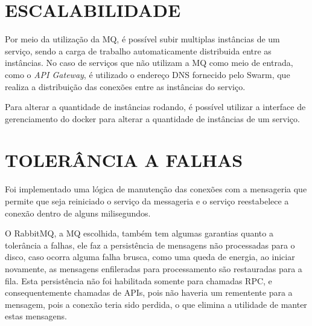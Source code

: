 \section{ESCALABILIDADE}

Por meio da utilização da \ac{MQ}, é possível subir multiplas instâncias de um serviço,
sendo a carga de trabalho automaticamente distribuida entre as instâncias. No caso de
serviços que não utilizam a \ac{MQ} como meio de entrada, como o \emph{API Gateway},
é utilizado o endereço \ac{DNS} fornecido pelo Swarm, que realiza a distribuição das
conexões entre as instâncias do serviço.

Para alterar a quantidade de instâncias rodando, é possível utilizar a interface de
gerenciamento do docker para alterar a quantidade de instâncias de um serviço.

\section{TOLERÂNCIA A FALHAS}

Foi implementado uma lógica de manutenção das conexões com a mensageria que permite
que seja reiniciado o serviço da messageria e o serviço reestabelece a conexão dentro
de alguns milisegundos.

O RabbitMQ, a \ac{MQ} escolhida, também tem algumas garantias quanto a tolerância a
falhas, ele faz a persistência de mensagens não processadas para o disco, caso ocorra
alguma falha brusca, como uma queda de energia, ao iniciar novamente, as mensagens
enfileradas para processamento são restauradas para a fila. Esta persistência não foi
habilitada somente para chamadas \ac{RPC}, e consequentemente chamadas de \acp{API},
pois não haveria um rementente para a mensagem, pois a conexão teria sido perdida,
o que elimina a utilidade de manter estas mensagens.
